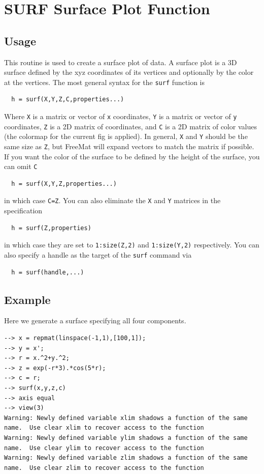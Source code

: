 \section{SURF Surface Plot Function}

\subsection{Usage}

This routine is used to create a surface plot of data.  A 
surface plot is a 3D surface defined by the xyz coordinates
of its vertices and optionally by the color at the vertices.
The most general syntax for the \verb|surf| function is
\begin{verbatim}
  h = surf(X,Y,Z,C,properties...)
\end{verbatim}
Where \verb|X| is a matrix or vector of \verb|x| coordinates, \verb|Y| is a
matrix or vector of \verb|y| coordinates, \verb|Z| is a 2D matrix of
coordinates, and \verb|C| is a 2D matrix of color values (the colormap
for the current fig is applied).  In general, \verb|X| and \verb|Y| should
be the same size as \verb|Z|, but FreeMat will expand vectors to match
the matrix if possible.
If you want the color of the surface to be defined by the height
of the surface, you can omit \verb|C|
\begin{verbatim}
  h = surf(X,Y,Z,properties...)
\end{verbatim}
in which case \verb|C=Z|.  You can also eliminate the \verb|X| and \verb|Y|
matrices in the specification
\begin{verbatim}
  h = surf(Z,properties)
\end{verbatim}
in which case they are set to \verb|1:size(Z,2)| and \verb|1:size(Y,2)|
respectively.
You can also specify a handle as the target of the \verb|surf| command
via
\begin{verbatim}
  h = surf(handle,...)
\end{verbatim}
\subsection{Example}

Here we generate a surface specifying all four components.
\begin{verbatim}
--> x = repmat(linspace(-1,1),[100,1]);
--> y = x';
--> r = x.^2+y.^2;
--> z = exp(-r*3).*cos(5*r);
--> c = r;
--> surf(x,y,z,c)
--> axis equal
--> view(3)
Warning: Newly defined variable xlim shadows a function of the same name.  Use clear xlim to recover access to the function
Warning: Newly defined variable ylim shadows a function of the same name.  Use clear ylim to recover access to the function
Warning: Newly defined variable zlim shadows a function of the same name.  Use clear zlim to recover access to the function
\end{verbatim}


